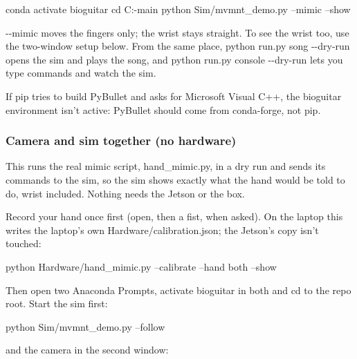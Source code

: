 \documentclass[11pt,letterpaper]{article}
\newcommand{\code}[1]{\textcolor{codeblue}{\ttfamily\smaller\relax #1}}
\begin{document}
\begin{codeblock}
conda activate bioguitar
cd C:\Users\JMAMA\Documents\Capstone\CapstoneBioGuitar-main
python Sim/mvmnt_demo.py --mimic --show
\end{codeblock}
\code{-{}-{}mimic} moves the fingers only; the wrist stays straight. To see the wrist too, use the two-window setup below. From the same place, \code{python run.py song -{}-{}dry-{}\allowbreak{}run} opens the sim and plays the song, and \code{python run.py console -{}-{}dry-{}\allowbreak{}run} lets you type commands and watch the sim.

If pip tries to build PyBullet and asks for Microsoft Visual C++, the \code{bioguitar} environment isn't active: PyBullet should come from conda-forge, not pip.

\subsubsection*{Camera and sim together (no hardware)}
This runs the real mimic script, \code{hand\_\allowbreak{}mimic.py}, in a dry run and sends its commands to the sim, so the sim shows exactly what the hand would be told to do, wrist included. Nothing needs the Jetson or the box.

Record your hand once first (open, then a fist, when asked). On the laptop this writes the laptop's own \code{Hardware/\allowbreak{}calibration.json}; the Jetson's copy isn't touched:

\begin{codeblock}
python Hardware/hand_mimic.py --calibrate --hand both --show
\end{codeblock}
Then open two Anaconda Prompts, activate \code{bioguitar} in both and \code{cd} to the repo root. Start the sim first:

\begin{codeblock}
python Sim/mvmnt_demo.py --follow
\end{codeblock}
and the camera in the second window:
\end{document}
